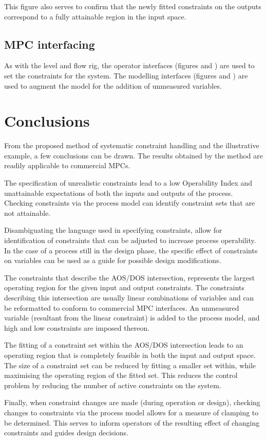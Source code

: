 \documentclass[final,authoryear,5pt,times,twocolumn]{elsarticle}
\begin{document}
This figure also serves to confirm that the newly fitted constraints on the outputs correspond to a fully attainable region in the input space.


\subsection{MPC interfacing}
As with the level and flow rig, the operator interfaces (figures and ) are used to set the constraints for the system.
The modelling interfaces (figures and ) are used to augment the model for the addition of unmeasured variables.


\section{Conclusions}\label{sec:conclusions}
From the proposed method of systematic constraint handling and the illustrative example, a few conclusions can be drawn.
The results obtained by the method are readily applicable to commercial MPCs.

The specification of unrealistic constraints lead to a low Operability Index and unattainable expectations of both the inputs and outputs of the process.
Checking constraints via the process model can identify constraint sets that are not attainable.

Disambiguating the language used in specifying constraints, allow for identification of constraints that can be adjusted to increase process operability.
In the case of a process still in the design phase, the specific effect of constraints on variables can be used as a guide for possible design modifications. 

The constraints that describe the AOS/DOS intersection, represents the largest operating region for the given input and output constraints.
The constraints describing this intersection are usually linear combinations of variables and can be reformatted to conform to commercial MPC interfaces.
An unmeasured variable (resultant from the linear constraint) is added to the process model, and high and low constraints are imposed thereon.

The fitting of a constraint set within the AOS/DOS intersection leads to an operating region that is completely feasible in both the input and output space.
The size of a constraint set can be reduced by fitting a smaller set within, while maximising the operating region of the fitted set.
This reduces the control problem by reducing the number of active constraints on the system.

Finally, when constraint changes are made (during operation or design), checking changes to constraints via the process model allows for a measure of clamping to be determined.
This serves to inform operators of the resulting effect of changing constraints and guides design decisions.




\end{document}
